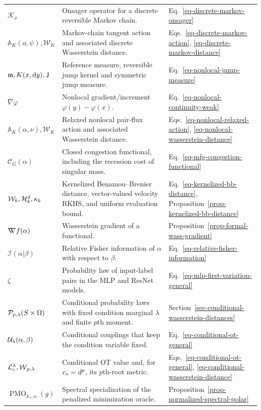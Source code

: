 {\begin{longtable}{>{\raggedright\arraybackslash}p{}
                  >{\raggedright\arraybackslash}p{}
                  >{\raggedright\arraybackslash}p{}}
$\mathcal K_\rho$ & Onsager operator for a discrete reversible Markov chain. & Eq.~\eqref{eq-discrete-markov-onsager} \\
$\mathbb A_K(a,\psi),\mathcal W_K$ & Markov-chain tangent action and associated discrete Wasserstein distance. & Eqs.~\eqref{eq-discrete-markov-action}, \eqref{eq-discrete-markov-distance} \\
$\mathfrak m,K(x,\mathrm{d} y),\mathsf J$ & Reference measure, reversible jump kernel and symmetric jump measure. & Eq.~\eqref{eq-nonlocal-jump-measure} \\
$\bar\nabla\varphi$ & Nonlocal gradient/increment $\varphi(y)-\varphi(x)$. & Eq.~\eqref{eq-nonlocal-continuity-weak} \\
$\mathbb A_K(\alpha,\nu),\mathcal W_K$ & Relaxed nonlocal pair-flux action and associated Wasserstein distance. & Eqs.~\eqref{eq-nonlocal-relaxed-action}, \eqref{eq-nonlocal-wasserstein-distance} \\
$\mathcal C_G(\alpha)$ & Closed congestion functional, including the recession cost of singular mass. & Eq.~\eqref{eq-mfg-congestion-functional} \\
$\mathcal W_k,\mathcal{H}_k^d,\kappa_k$ & Kernelized Benamou--Brenier distance, vector-valued velocity RKHS, and uniform evaluation bound. & Eq.~\eqref{eq-kernelized-bb-distance}, Proposition~\ref{prop-kernelized-bb-distance} \\
$\mathord{\nabla\mkern-9.3mu\nabla} f(\alpha)$ & Wasserstein gradient of a functional. & Proposition~\ref{prop-formal-wass-gradient} \\
$\mathcal I(\alpha|\beta)$ & Relative Fisher information of $\alpha$ with respect to $\beta$. & Eq.~\eqref{eq-relative-fisher-information} \\
$\zeta$ & Probability law of input-label pairs in the MLP and ResNet models. & Eq.~\eqref{eq-mlp-first-variation-general} \\
$\mathcal{P}_{p,\lambda}(S\times\Omega)$ & Conditional probability laws with fixed condition marginal $\lambda$ and finite $p$th moment. & Section~\ref{sec-conditional-wasserstein-distances} \\
$\mathcal{U}_\lambda(\alpha,\beta)$ & Conditional couplings that keep the condition variable fixed. & Eq.~\eqref{eq-conditional-ot-general} \\
$\mathcal{L}_c^\lambda,\operatorname{\mathcal{W}}_{p,\lambda}$ & Conditional OT value and, for $c_s=d^p$, its $p$th-root metric. & Eqs.~\eqref{eq-conditional-ot-general}, \eqref{eq-conditional-wasserstein-distance} \\
$\operatorname{PMO}_{\mathbb A_\gamma,\alpha}(g)$ & Spectral specialization of the penalized minimization oracle. & Proposition~\ref{prop-normalized-spectral-polar} \\

\end{longtable}}
